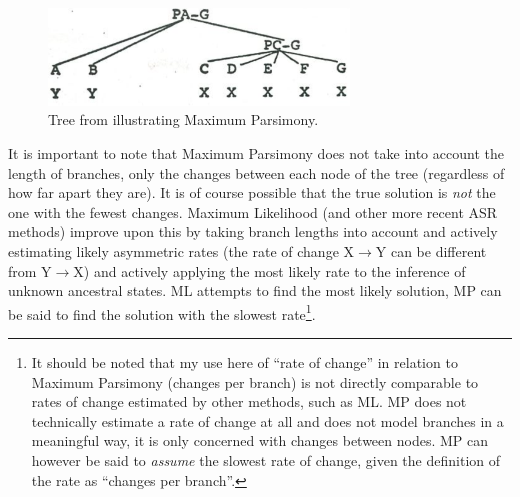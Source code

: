 \documentclass[12pt,letterpaper]{article}
\begin{document}
\begin{figure}[ht]
\centering
\includegraphics[width=8cm]{illustrations/Clark_1977_tree.png}
\caption{{Tree from \citet[19]{clark1973aspects} illustrating Maximum Parsimony.}}
\label{fig:clark_tree}
\end{figure}

It is important to note that Maximum Parsimony does not take into account the length of branches, only the changes between each node of the tree (regardless of how far apart they are). It is of course possible that the true solution is \textit{not} the one with the fewest changes. Maximum Likelihood (and other more recent ASR methods) improve upon this by taking branch lengths into account and actively estimating likely asymmetric rates (the rate of change X$\rightarrow$Y can be different from Y$\rightarrow$X) and actively applying the most likely rate to the inference of unknown ancestral states. ML attempts to find the most likely solution, MP can be said to find the solution with the slowest rate\footnote{It should be noted that my use here of ``rate of change'' in relation to Maximum Parsimony (changes per branch) is not directly comparable to rates of change estimated by other methods, such as ML. MP does not technically estimate a rate of change at all and does not model branches in a meaningful way, it is only concerned with changes between nodes. MP can however be said to \emph{assume} the slowest rate of change, given the definition of the rate as ``changes per branch''.}.
\end{document}
